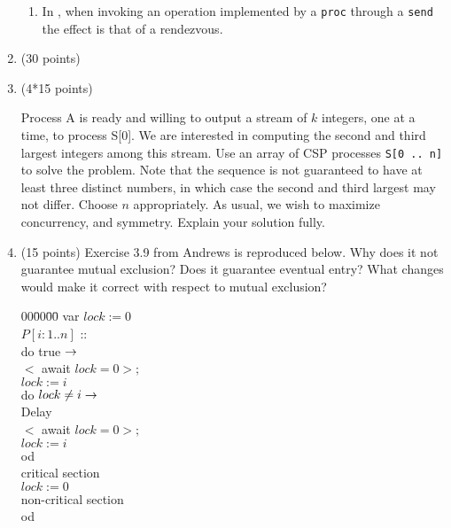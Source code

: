\begin{enumerate}
\begin{enumerate}
\item
In \SR, when invoking an operation implemented by a {\tt proc} through
a {\tt send} the effect is that of a rendezvous.
\end{enumerate}

\item (30 points)
\item (4*15 points)

Process A is ready and willing to output a stream of $k$ integers, one
at a time, to process S[0].  We are interested in computing the second
and third largest integers among this stream.  Use an array of CSP
processes {\tt S[0 .. n]} to solve the problem.  Note that the
sequence is not guaranteed to have at least three distinct numbers, in
which case the second and third largest may not differ.  Choose $n$
appropriately.  As usual, we wish to maximize concurrency, and
symmetry.  Explain your solution fully.

\item (15 points)
Exercise 3.9 from Andrews is reproduced below.  Why does it not
guarantee mutual exclusion?  Does it guarantee eventual entry?  What
changes would make it correct with respect to mutual exclusion?

\begin{tabbing}
00\=00\=00\=\kill
var $lock := 0$\\
$P[i:1..n]$ ::\+\\
do true $\rightarrow$\+\\
  $<$ await $lock = 0 >;$\\
  $lock := i$\\
  do $lock \neq i \rightarrow$\+\\
    Delay\\
    $<$ await $lock = 0 >;$\\
    $lock := i$\-\\
  od\\
  critical section\\
  $lock := 0$\\
  non-critical section\-\\
od
\end{tabbing}


\end{enumerate}

